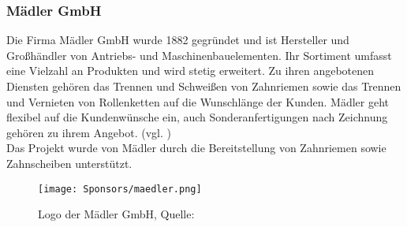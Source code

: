 \subsubsection{Mädler GmbH}
Die Firma Mädler GmbH wurde 1882 gegründet und ist Hersteller und Großhändler von Antriebs- und Maschinenbauelementen. Ihr Sortiment umfasst eine Vielzahl an Produkten und wird stetig erweitert. Zu ihren angebotenen Diensten gehören das Trennen und Schweißen von Zahnriemen sowie das Trennen und Vernieten von Rollenketten auf die Wunschlänge der Kunden. Mädler geht flexibel auf die Kundenwünsche ein, auch Sonderanfertigungen nach Zeichnung gehören zu ihrem Angebot. (vgl. \cite{mädler})\\
Das Projekt wurde von Mädler durch die Bereitstellung von Zahnriemen sowie Zahnscheiben unterstützt.

\begin{figure}[H]
    \centering
    \texttt{[image: Sponsors/maedler.png]}
    \caption{Logo der Mädler GmbH, Quelle: \cite{maedler_logo}}
    \label{fig:maedler_logo}
\end{figure}


